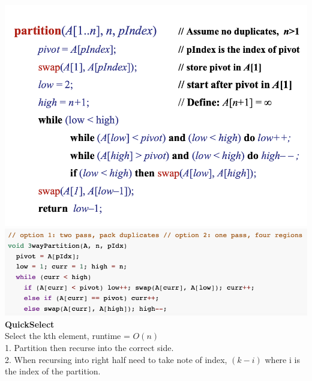 \documentclass[10pt, a4paper]{article}
\begin{document}
\begin{multicols*}{3}
		\includegraphics[scale = .27]{./assets/Partition}\\
		\includegraphics[scale=.4]{./assets/Partition3}\\
		\textbf{QuickSelect}\\
		Select the kth element, runtime = $O(n)$\\
		1. Partition then recurse into the correct side.\\
		2. When recursing into right half need to take note of index, $(k - i)$ where i is the index of the partition.\\ 
	

\end{multicols*}
\end{document}

